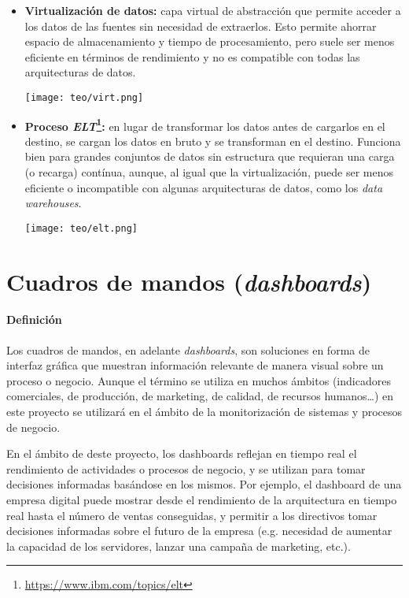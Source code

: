 \begin{itemize}
	\item \textbf{Virtualización de datos:} capa virtual de abstracción que
		permite acceder a los datos de las fuentes sin necesidad de extraerlos.
		Esto permite ahorrar espacio de almacenamiento y tiempo de
		procesamiento, pero suele ser menos eficiente en términos de rendimiento
		y no es compatible con todas las arquitecturas de datos.

		\begin{minipage}{\linewidth}
			\centering
			\texttt{[image: teo/virt.png]}
		\end{minipage}
	\item \textbf{Proceso \textit{ELT}\footnote{\url{https://www.ibm.com/topics/elt}}:}
		en lugar de transformar los datos antes de cargarlos en el destino, se
		cargan los datos en bruto y se transforman en el destino. Funciona bien
		para grandes conjuntos de datos sin estructura que requieran una carga
		(o recarga) contínua, aunque, al igual que la virtualización, puede ser
		menos eficiente o incompatible con algunas arquitecturas de datos, como
		los \textit{data warehouses}.

		\begin{minipage}{\linewidth}
			\centering
			\texttt{[image: teo/elt.png]}
		\end{minipage}
\end{itemize}


\newpage{}
\section{Cuadros de mandos (\textit{dashboards})}\label{sec:dashboards}
\paragraph{Definición}
Los cuadros de mandos, en adelante \textit{dashboards}, son soluciones en forma
de interfaz gráfica que muestran información relevante de manera visual sobre un
proceso o negocio. Aunque el término se utiliza en muchos ámbitos (indicadores
comerciales, de producción, de marketing, de calidad, de recursos humanos\ldots)
en este proyecto se utilizará en el ámbito de la monitorización de sistemas y
procesos de negocio.

En el ámbito de deste proyecto, los dashboards reflejan en tiempo real el
rendimiento de actividades o procesos de negocio, y se utilizan para tomar
decisiones informadas basándose en los mismos. Por ejemplo, el dashboard de una
empresa digital puede mostrar desde el rendimiento de la arquitectura en tiempo
real hasta el número de ventas conseguidas, y permitir a los directivos tomar
decisiones informadas sobre el futuro de la empresa (e.g. necesidad de aumentar
la capacidad de los servidores, lanzar una campaña de marketing, etc.).

